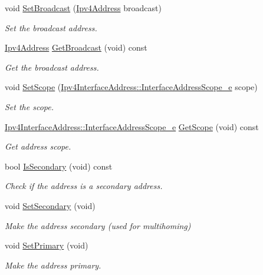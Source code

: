 \begin{DoxyCompactItemize}
void \hyperlink{classns3_1_1Ipv4InterfaceAddress_a1681e47fd9b87aaea378522a3dbdcc47}{Set\+Broadcast} (\hyperlink{classns3_1_1Ipv4Address}{Ipv4\+Address} broadcast)
\begin{DoxyCompactList}\small\item\em Set the broadcast address. \end{DoxyCompactList}\item 
\hyperlink{classns3_1_1Ipv4Address}{Ipv4\+Address} \hyperlink{classns3_1_1Ipv4InterfaceAddress_aefd7b853e207b6776669bc3bcc2f3d72}{Get\+Broadcast} (void) const 
\begin{DoxyCompactList}\small\item\em Get the broadcast address. \end{DoxyCompactList}\item 
void \hyperlink{classns3_1_1Ipv4InterfaceAddress_a8b539cd5ac5b203f42b801a90a621934}{Set\+Scope} (\hyperlink{classns3_1_1Ipv4InterfaceAddress_a329cea433e74f717c26c9e51c4fcd3d8}{Ipv4\+Interface\+Address\+::\+Interface\+Address\+Scope\+\_\+e} scope)
\begin{DoxyCompactList}\small\item\em Set the scope. \end{DoxyCompactList}\item 
\hyperlink{classns3_1_1Ipv4InterfaceAddress_a329cea433e74f717c26c9e51c4fcd3d8}{Ipv4\+Interface\+Address\+::\+Interface\+Address\+Scope\+\_\+e} \hyperlink{classns3_1_1Ipv4InterfaceAddress_afe80259f5353bbb4bee676a0accba612}{Get\+Scope} (void) const 
\begin{DoxyCompactList}\small\item\em Get address scope. \end{DoxyCompactList}\item 
bool \hyperlink{classns3_1_1Ipv4InterfaceAddress_a4bb30f41916eede4443c49ae530df4ff}{Is\+Secondary} (void) const 
\begin{DoxyCompactList}\small\item\em Check if the address is a secondary address. \end{DoxyCompactList}\item 
void \hyperlink{classns3_1_1Ipv4InterfaceAddress_a0ed7eba8d8fd121cd3a83515cc52266f}{Set\+Secondary} (void)
\begin{DoxyCompactList}\small\item\em Make the address secondary (used for multihoming) \end{DoxyCompactList}\item 
void \hyperlink{classns3_1_1Ipv4InterfaceAddress_afb2dd206b67c298dd1591cc9b2ae8cca}{Set\+Primary} (void)
\begin{DoxyCompactList}\small\item\em Make the address primary. \end{DoxyCompactList}\end{DoxyCompactItemize}
